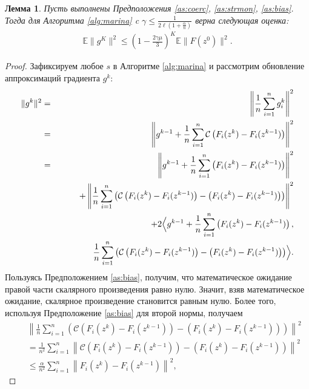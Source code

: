 \documentclass{ProcISPRAS}
\newtheorem{lemma}{Лемма}
\begin{document}
\begin{lemma} \label{lem:1}
Пусть выполнены Предположения \ref{as:coerc}, \ref{as:strmon}, \ref{as:bias}. Тогда для Алгоритма \ref{alg:marina} c $\gamma \leqslant\frac{1}{2\ell(1+\frac{\alpha}{n})}$ верна следующая оценка:
\begin{eqnarray*}
    \mathbb E\| g^{K} \|^2 \leqslant \left(1 - \frac{2\gamma\mu}{3}\right)^{K}\mathbb E\|F(z^0)\|^2.
\end{eqnarray*}
\end{lemma}
\begin{proof}
Зафиксируем любое $s$ в Алгоритме \ref{alg:marina} и рассмотрим обновление аппроксимаций градиента $g^k$:
\begin{eqnarray*}
    \| g^{k} \|^2 &=& 
    \left\| \frac{1}{n}\sum\limits_{i=1}^n g_i^{k} \right\|^2\\
    &=& \left\|g^{k-1} + \frac{1}{n}\sum\limits_{i=1}^n \mathcal{C}\left(F_i(z^{k}) - F_i(z^{k-1})\right)\right\|^2 \\
    &=& \left\|g^{k-1} + \frac{1}{n}\sum\limits_{i=1}^n \left(F_i(z^{k}) - F_i(z^{k-1})\right)\right\|^2 \\
    & & + \left\|\frac{1}{n}\sum\limits_{i=1}^n \left(\mathcal{C}\left(F_i(z^{k}) - F_i(z^{k-1})\right) - \left(F_i(z^{k}) - F_i(z^{k-1})\right)\right)\right\|^2 \\
    & & + 2\Bigl\langle g^{k-1} + \frac{1}{n}\sum\limits_{i=1}^n \left(F_i(z^{k}) - F_i(z^{k-1})\right),\\
    & &\quad\quad\quad\quad\frac{1}{n}\sum\limits_{i=1}^n \left(\mathcal{C}\left(F_i(z^{k}) - F_i(z^{k-1})\right) - \left(F_i(z^{k}) - F_i(z^{k-1})\right)\right)\Bigr\rangle.
\end{eqnarray*}
Пользуясь Предположением \ref{as:bias}, получим, что математическое ожидание правой части скалярного произведения равно нулю. Значит, взяв математическое ожидание, скалярное произведение становится равным нулю. Более того, используя Предположение \ref{as:bias} для второй нормы, получаем
\begin{eqnarray*}
    & &\left\|\frac{1}{n}\sum\limits_{i=1}^n \left(\mathcal{C}\left(F_i(z^{k}) - F_i(z^{k-1})\right) - \left(F_i(z^{k}) - F_i(z^{k-1})\right)\right)\right\|^2 \\
    & &= \frac{1}{n^2}\sum\limits_{i=1}^n\left\| \mathcal{C}\left(F_i(z^{k}) - F_i(z^{k-1})\right) - \left(F_i(z^{k}) - F_i(z^{k-1})\right)\right\|^2\\
    & & \leqslant \frac{\alpha}{n^2}\sum\limits_{i=1}^n\left\|F_i(z^{k}) - F_i(z^{k-1})\right\|^2,

\end{eqnarray*}
\end{proof}
\end{document}
